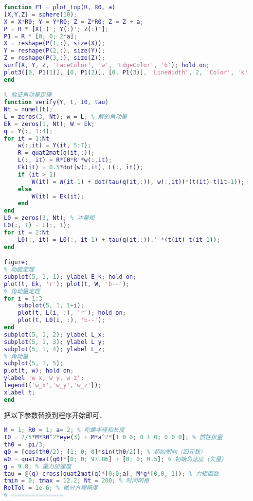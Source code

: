 \begin{lstlisting}[language=matlab, caption=top\_sim.m]
% 画陀螺
function P1 = plot_top(R, R0, a)
[X,Y,Z] = sphere(10);
X = X*R0; Y = Y*R0; Z = Z*R0; Z = Z + a;
P = R * [X(:)'; Y(:)'; Z(:)'];
P1 = R * [0; 0; 2*a];
X = reshape(P(1,:), size(X));
Y = reshape(P(2,:), size(Y));
Z = reshape(P(3,:), size(Z));
surf(X, Y, Z, 'FaceColor', 'w', 'EdgeColor', 'b'); hold on;
plot3([0, P1(1)], [0, P1(2)], [0, P1(3)], 'LineWidth', 2, 'Color', 'k');
end

% 验证角动量定理
function verify(Y, t, I0, tau)
Nt = numel(t);
L = zeros(3, Nt); w = L; % 解的角动量
Ek = zeros(1, Nt); W = Ek;
q = Y(:, 1:4);
for it = 1:Nt
    w(:,it) = Y(it, 5:7);
    R = quat2mat(q(it,:));
    L(:, it) = R*I0*R'*w(:,it);
    Ek(it) = 0.5*dot(w(:,it), L(:, it));
    if (it > 1)
        W(it) = W(it-1) + dot(tau(q(it,:)), w(:,it))*(t(it)-t(it-1));
    else
        W(it) = Ek(it);
    end
end
L0 = zeros(3, Nt); % 冲量矩
L0(:, 1) = L(:, 1);
for it = 2:Nt
    L0(:, it) = L0(:, it-1) + tau(q(it,:)).' *(t(it)-t(it-1));
end

figure;
% 动能定理
subplot(5, 1, 1); ylabel E_k; hold on;
plot(t, Ek, 'r'); plot(t, W, 'b--');
% 角动量定理
for i = 1:3
    subplot(5, 1, 1+i);
    plot(t, L(i, :), 'r'); hold on;
    plot(t, L0(i, :), 'b--');
end
subplot(5, 1, 2); ylabel L_x;
subplot(5, 1, 3); ylabel L_y;
subplot(5, 1, 4); ylabel L_z;
% 角动量
subplot(5, 1, 5);
plot(t, w); hold on;
ylabel 'w_x, w_y, w_z';
legend({'w_x','w_y','w_z'});
xlabel t;
end
\end{lstlisting}

把以下参数替换到程序开始即可．
\begin{lstlisting}[language=matlab]
% === 参数设置 ===
M = 1; R0 = 1; a= 2; % 陀螺半径和长度
I0 = 2/5*M*R0^2*eye(3) + M*a^2*[1 0 0; 0 1 0; 0 0 0]; % 惯性张量
th0 = -pi/3;
q0 = [cos(th0/2); [1; 0; 0]*sin(th0/2)]; % 初始朝向（四元数）
w0 = quat2mat(q0)*[0; 0; 97.86] + [0; 0; 0.5]; % 初始角速度（矢量）
g = 9.8; % 重力加速度
tau = @(q) cross(quat2mat(q)*[0;0;a], M*g*[0,0,-1]); % 力矩函数
tmin = 0; tmax = 12.2; Nt = 200; % 时间网格
RelTol = 1e-6; % 微分方程精度
% ===============
\end{lstlisting}
